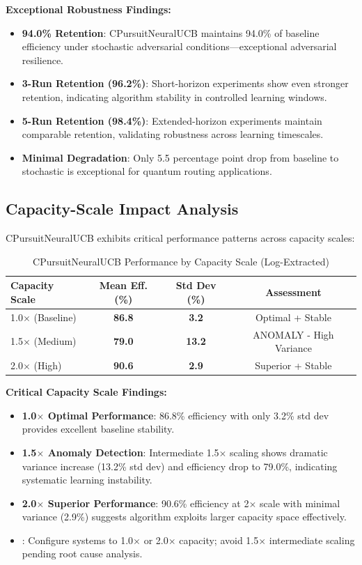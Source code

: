 \documentclass[12pt,a4paper]{article}
\newcommand{\success}[1]{\textcolor{accentgreen}{\textbf{#1}}}
\newcommand{\warning}[1]{\textcolor{warningred}{\textbf{#1}}}
\begin{document}
\textbf{Exceptional Robustness Findings:}
\begin{itemize}
    \item \success{94.0\% Retention}: CPursuitNeuralUCB maintains 94.0\% of baseline efficiency under stochastic adversarial conditions—exceptional adversarial resilience.
    \item \success{3-Run Retention (96.2\%)}: Short-horizon experiments show even stronger retention, indicating algorithm stability in controlled learning windows.
    \item \success{5-Run Retention (98.4\%)}: Extended-horizon experiments maintain comparable retention, validating robustness across learning timescales.
    \item \success{Minimal Degradation}: Only 5.5 percentage point drop from baseline to stochastic is exceptional for quantum routing applications.
\end{itemize}

\subsection{Capacity-Scale Impact Analysis}

CPursuitNeuralUCB exhibits critical performance patterns across capacity scales:

\begin{table}[H]
\centering
\caption{CPursuitNeuralUCB Performance by Capacity Scale (Log-Extracted)}
\begin{tabular}{@{}lccc@{}}
\toprule
\textbf{Capacity Scale} & \textbf{Mean Eff. (\%)} & \textbf{Std Dev (\%)} & \textbf{Assessment} \\
\midrule
1.0$\times$ (Baseline) & \success{86.8} & \success{3.2} & Optimal + Stable \\
1.5$\times$ (Medium) & \warning{79.0} & \warning{13.2} & ANOMALY - High Variance \\
2.0$\times$ (High) & \success{90.6} & \success{2.9} & Superior + Stable \\
\bottomrule
\end{tabular}
\end{table}

\textbf{Critical Capacity Scale Findings:}
\begin{itemize}
    \item \success{1.0$\times$ Optimal Performance}: 86.8\% efficiency with only 3.2\% std dev provides excellent baseline stability.
    \item \warning{1.5$\times$ Anomaly Detection}: Intermediate 1.5$\times$ scaling shows dramatic variance increase (13.2\% std dev) and efficiency drop to 79.0\%, indicating systematic learning instability.
    \item \success{2.0$\times$ Superior Performance}: 90.6\% efficiency at 2$\times$ scale with minimal variance (2.9\%) suggests algorithm exploits larger capacity space effectively.
    \item {}: Configure systems to 1.0$\times$ or 2.0$\times$ capacity; avoid 1.5$\times$ intermediate scaling pending root cause analysis.
\end{itemize}
\end{document}
